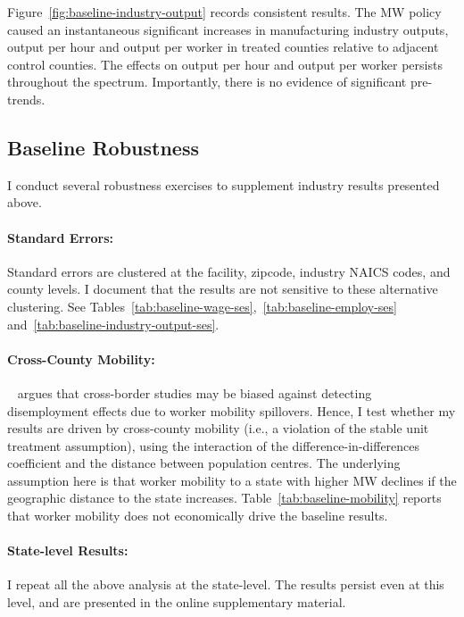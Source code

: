 \documentclass[12pt, english]{article}
\begin{document}
    Figure~\ref{fig:baseline-industry-output} records consistent results. The MW policy caused an instantaneous significant increases in manufacturing industry outputs, output per hour and output per worker in treated counties relative to adjacent control counties. The effects on output per hour and output per worker persists throughout the spectrum. Importantly, there is no evidence of significant pre-trends.
    

    \subsection{Baseline Robustness}\label{subsec:baseline-robustness}
    I conduct several robustness exercises to supplement industry results presented above.

    \paragraph{Standard Errors:} Standard errors are clustered at the facility, zipcode, industry NAICS codes, and county levels. I document that the results are not sensitive to these alternative clustering. See Tables~\ref{tab:baseline-wage-ses},~\ref{tab:baseline-employ-ses} and~\ref{tab:baseline-industry-output-ses}.

    \paragraph{Cross-County Mobility:}~\cite{neumark2019econometrics} argues that cross-border studies may be biased against detecting disemployment effects due to worker mobility spillovers. Hence, I test whether my results are driven by cross-county mobility (i.e., a violation of the stable unit treatment assumption), using the interaction of the difference-in-differences coefficient and the distance between population centres. The underlying assumption here is that worker mobility to a state with higher MW declines if the geographic distance to the state increases. Table~\ref{tab:baseline-mobility} reports that worker mobility does not economically drive the baseline results.

    \paragraph{State-level Results:} I repeat all the above analysis at the state-level. The results persist even at this level, and are presented in the online supplementary material.
\end{document}
